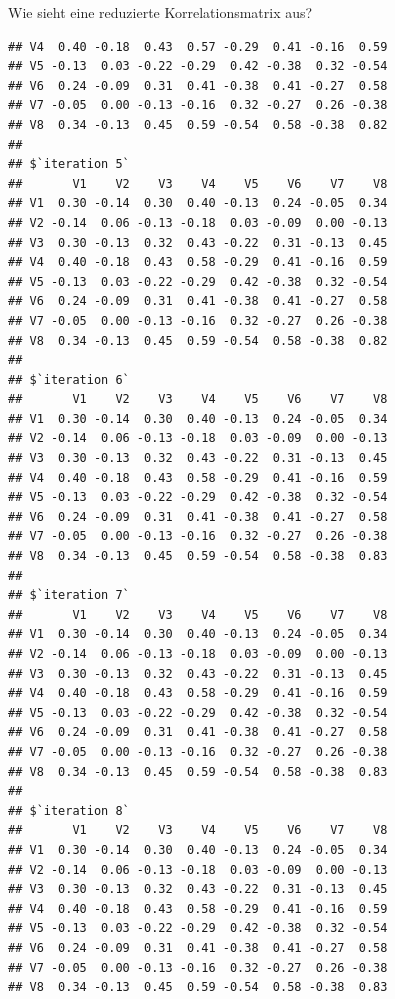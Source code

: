 \documentclass[
  ignorenonframetext,
]{beamer}
\begin{document}
\begin{frame}[fragile]{Wie sieht eine reduzierte Korrelationsmatrix
aus?}
\begin{verbatim}
## V4  0.40 -0.18  0.43  0.57 -0.29  0.41 -0.16  0.59
## V5 -0.13  0.03 -0.22 -0.29  0.42 -0.38  0.32 -0.54
## V6  0.24 -0.09  0.31  0.41 -0.38  0.41 -0.27  0.58
## V7 -0.05  0.00 -0.13 -0.16  0.32 -0.27  0.26 -0.38
## V8  0.34 -0.13  0.45  0.59 -0.54  0.58 -0.38  0.82
## 
## $`iteration 5`
##       V1    V2    V3    V4    V5    V6    V7    V8
## V1  0.30 -0.14  0.30  0.40 -0.13  0.24 -0.05  0.34
## V2 -0.14  0.06 -0.13 -0.18  0.03 -0.09  0.00 -0.13
## V3  0.30 -0.13  0.32  0.43 -0.22  0.31 -0.13  0.45
## V4  0.40 -0.18  0.43  0.58 -0.29  0.41 -0.16  0.59
## V5 -0.13  0.03 -0.22 -0.29  0.42 -0.38  0.32 -0.54
## V6  0.24 -0.09  0.31  0.41 -0.38  0.41 -0.27  0.58
## V7 -0.05  0.00 -0.13 -0.16  0.32 -0.27  0.26 -0.38
## V8  0.34 -0.13  0.45  0.59 -0.54  0.58 -0.38  0.82
## 
## $`iteration 6`
##       V1    V2    V3    V4    V5    V6    V7    V8
## V1  0.30 -0.14  0.30  0.40 -0.13  0.24 -0.05  0.34
## V2 -0.14  0.06 -0.13 -0.18  0.03 -0.09  0.00 -0.13
## V3  0.30 -0.13  0.32  0.43 -0.22  0.31 -0.13  0.45
## V4  0.40 -0.18  0.43  0.58 -0.29  0.41 -0.16  0.59
## V5 -0.13  0.03 -0.22 -0.29  0.42 -0.38  0.32 -0.54
## V6  0.24 -0.09  0.31  0.41 -0.38  0.41 -0.27  0.58
## V7 -0.05  0.00 -0.13 -0.16  0.32 -0.27  0.26 -0.38
## V8  0.34 -0.13  0.45  0.59 -0.54  0.58 -0.38  0.83
## 
## $`iteration 7`
##       V1    V2    V3    V4    V5    V6    V7    V8
## V1  0.30 -0.14  0.30  0.40 -0.13  0.24 -0.05  0.34
## V2 -0.14  0.06 -0.13 -0.18  0.03 -0.09  0.00 -0.13
## V3  0.30 -0.13  0.32  0.43 -0.22  0.31 -0.13  0.45
## V4  0.40 -0.18  0.43  0.58 -0.29  0.41 -0.16  0.59
## V5 -0.13  0.03 -0.22 -0.29  0.42 -0.38  0.32 -0.54
## V6  0.24 -0.09  0.31  0.41 -0.38  0.41 -0.27  0.58
## V7 -0.05  0.00 -0.13 -0.16  0.32 -0.27  0.26 -0.38
## V8  0.34 -0.13  0.45  0.59 -0.54  0.58 -0.38  0.83
## 
## $`iteration 8`
##       V1    V2    V3    V4    V5    V6    V7    V8
## V1  0.30 -0.14  0.30  0.40 -0.13  0.24 -0.05  0.34
## V2 -0.14  0.06 -0.13 -0.18  0.03 -0.09  0.00 -0.13
## V3  0.30 -0.13  0.32  0.43 -0.22  0.31 -0.13  0.45
## V4  0.40 -0.18  0.43  0.58 -0.29  0.41 -0.16  0.59
## V5 -0.13  0.03 -0.22 -0.29  0.42 -0.38  0.32 -0.54
## V6  0.24 -0.09  0.31  0.41 -0.38  0.41 -0.27  0.58
## V7 -0.05  0.00 -0.13 -0.16  0.32 -0.27  0.26 -0.38
## V8  0.34 -0.13  0.45  0.59 -0.54  0.58 -0.38  0.83
\end{verbatim}
\end{frame}
\end{document}

